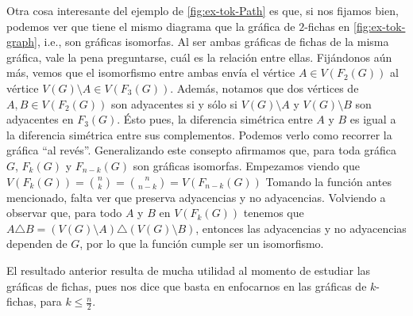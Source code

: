 \newpage

Otra cosa interesante del ejemplo de \cref{fig:ex-tok-Path} es que, si nos
fijamos bien, podemos ver que tiene el mismo diagrama que la gr\'afica de
$2$-fichas en \cref{fig:ex-tok-graph}, i.e., son gr\'aficas isomorfas. Al ser
ambas gr\'aficas de fichas de la misma gr\'afica, vale la pena preguntarse,
cu\'al es la relaci\'on entre ellas. Fij\'andonos a\'un m\'as, vemos que el
isomorfismo entre ambas env\'ia el v\'ertice $A \in V(F_2(G))$ al v\'ertice
$V(G) \setminus A \in V(F_3(G))$. Adem\'as, notamos que dos v\'ertices de $ A,B
\in V(F_2(G))$ son adyacentes si y s\'olo si $V(G) \setminus A$ y $V(G)
\setminus B$ son adyacentes en $F_3(G)$. \'Esto pues, la diferencia sim\'etrica
entre $A$ y $B$ es igual a la diferencia sim\'etrica entre sus complementos.
Podemos verlo como recorrer la gr\'afica ``al rev\'es''. Generalizando este
consepto afirmamos que, para toda gr\'afica $G$, $F_k(G)$ y $F_{n-k}(G)$ son
gr\'aficas isomorfas. Empezamos viendo que $V(F_k(G)) =\binom{n}{k}=
\binom{n}{n-k}= V(F_{n-k}(G))$ Tomando la funci\'on antes mencionado, falta ver
que preserva adyacencias y no adyacencias. Volviendo a observar que, para todo
$A$ y $B$ en $V(F_k(G))$ tenemos que $A \triangle B = (V(G)\setminus A)
\triangle (V(G)\setminus B)$, entonces las adyacencias y no adyacencias dependen
de $G$, por lo que la funci\'on cumple ser un isomorfismo. 

El resultado anterior resulta de mucha utilidad al momento de estudiar las
gr\'aficas de fichas, pues nos dice que basta en enfocarnos en las gr\'aficas de
$k$-fichas, para $k \leq \frac{n}{2}$.